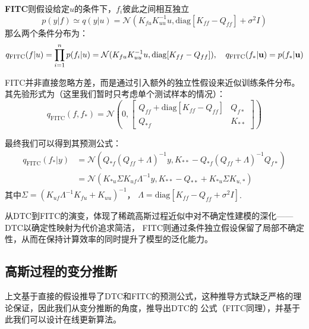 \textbf{FITC}\cite{snelson2007local}则假设给定$u$的条件下，$f_i$彼此之间相互独立
\begin{equation}
    p(y | f) \simeq q(y | u) = \mathcal N \left ( 
        K_{fu} K_{uu}^{-1} u, 
        \mathrm{diag} [K_{ff} - Q_{ff}] + \sigma^2 I
         \right )
\end{equation}
那么两个条件分布为：
\begin{equation}
    q_{\mathrm{FITC}}({f|u})
    = \prod_{i=1}^{n} p(f_i | u)
    =\mathcal{N}(K_{{fu}}K_{{uu}}^{-1}{u}, \mathrm{diag} [K_{ff} - Q_{ff}]),
    \quad q_{\mathrm{FITC}}({f_{*}}|{\bf u})=p({f_{*}}|{\bf u})
\end{equation}

FITC并非直接忽略方差，而是通过引入额外的独立性假设来近似训练条件分布。其先验形式为（这里我们暂时只考虑单个测试样本的情况）：
\begin{equation}
    q_{\text{FITC}}(f, f_*) = \mathcal N \left ( 0, \begin{bmatrix}
        Q_{ff} + \mathrm{diag} [K_{ff} - Q_{ff}] & Q_{f*} \\
        Q_{*f} & K_{**}
    \end{bmatrix} \right )
\end{equation}

最终我们可以得到其预测公式：
\begin{equation}
    \begin{aligned}
    q_{\text{FITC}}(f_* | y) &= \mathcal N \left (
        Q_{*f} (Q_{ff} + \Lambda)^{-1} y,
        K_{**} - Q_{*f} (Q_{ff} + \Lambda)^{-1} Q_{f*}
        \right ) \\
        &= \mathcal N \left (
            K_{*u} \Sigma K_{uf} \Lambda^{-1} y,
            K_{**} - Q_{**} + K_{*u} \Sigma K_{u, *}
            \right )
    \end{aligned}
\end{equation}
其中$\Sigma = (K_{uf} \Lambda^{-1} K_{fu} + K_{uu})^{-1}$， 
$\Lambda = \mathrm{diag} [K_{ff} - Q_{ff} + \sigma^2 I]$.

从DTC到FITC的演变，体现了稀疏高斯过程近似中对不确定性建模的深化——DTC以确定性映射为代价追求简洁，
FITC则通过条件独立假设保留了局部不确定性，从而在保持计算效率的同时提升了模型的泛化能力。

\subsection{高斯过程的变分推断}
上文基于直接的假设推导了DTC和FITC的预测公式，这种推导方式缺乏严格的理论保证，因此我们从变分推断的角度，推导出DTC的
公式（FITC同理），并基于此我们可以设计在线更新算法。

